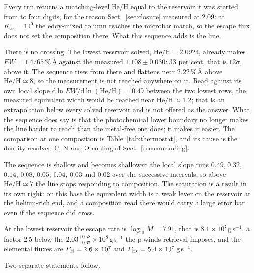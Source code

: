 \documentclass[english,a4paper]{my_memo}
\begin{document}
Every run returns a matching-level He/H equal to the reservoir it was started
from to four digits, for the reason Sect.~\ref{sec:closure} measured at
$2.09$: at $K_{zz} = 10^{9}$ the eddy-mixed column reaches the microbar
match, so the escape flux does not set the composition there. What this
sequence adds is the line.

\medskip
\noindent There is no crossing. The lowest reservoir solved,
$\mathrm{He/H} = 2.0924$, already makes $EW = 1.4765$\,\%\,\AA{} against the
measured $1.108 \pm 0.030$: $33$ per cent, that is $12\sigma$, above it. The
sequence rises from there and flattens near $2.22$\,\%\,\AA{} above
$\mathrm{He/H} \simeq 8$, so the measurement is not reached anywhere on it.
Read against its own local slope
$\mathrm{d}\ln EW/\mathrm{d}\ln(\mathrm{He/H}) = 0.49$ between the two lowest
rows, the measured equivalent width would be reached near
$\mathrm{He/H} \approx 1.2$; that is an extrapolation below every solved
reservoir and is not offered as the answer. What the sequence does say is
that the photochemical lower boundary no longer makes the line harder to
reach than the metal-free one does; it makes it easier. The comparison at one
composition is Table~\ref{tab:thermostat}, and its cause is the
density-resolved C, N and O cooling of Sect.~\ref{sec:cnocooling}.

The sequence is shallow and becomes shallower: the local slope runs $0.49$,
$0.32$, $0.14$, $0.08$, $0.05$, $0.04$, $0.03$ and $0.02$ over the successive
intervals, so above $\mathrm{He/H} \simeq 7$ the line stops responding to
composition. The saturation is a result in its own right: on this base the
equivalent width is a weak lever on the reservoir at the helium-rich end, and
a composition read there would carry a large error bar even if the sequence
did cross.

At the lowest reservoir the escape rate is $\log_{10}\dot M = 7.91$, that is
$8.1\times10^{7}$\,g\,s$^{-1}$, a factor $2.5$ below the
$2.03^{+0.58}_{-0.67}\times10^{8}$\,g\,s$^{-1}$ the p-winds retrieval
imposes, and the elemental fluxes are $F_{\rm H} = 2.6\times10^{7}$ and
$F_{\rm He} = 5.4\times10^{7}$\,g\,s$^{-1}$.

\medskip
\noindent Two separate statements follow.
\end{document}
